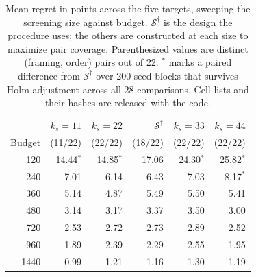 \begin{table}[!t]
\centering
\caption{Mean regret in points across the five targets, sweeping the
screening size against budget. $\mathcal{S}^{\dagger}$ is the design the
procedure uses; the others are constructed at each size to maximize pair
coverage. Parenthesized values are distinct (framing, order) pairs out of 22.
$^{*}$ marks a paired difference from $\mathcal{S}^{\dagger}$ over 200 seed
blocks that survives Holm adjustment across all 28 comparisons. Cell lists
and their hashes are released with the code.}
\label{tab:ksweep}
\footnotesize
\setlength{\tabcolsep}{5pt}
\begin{tabular}{@{}r r r r r r@{}}
\toprule
 & $k_s{=}11$ & $k_s{=}22$ & $\mathcal{S}^{\dagger}$ & $k_s{=}33$ & $k_s{=}44$ \\
Budget & (11/22) & (22/22) & (18/22) & (22/22) & (22/22) \\
\midrule
 120 & 14.44$^{*}$ & 14.85$^{*}$ & 17.06 & 24.30$^{*}$ & 25.82$^{*}$ \\
 240 &  7.01 &  6.14 &  6.43 &  7.03 &  8.17$^{*}$ \\
 360 &  5.14 &  4.87 &  5.49 &  5.50 &  5.41 \\
 480 &  3.14 &  3.17 &  3.37 &  3.50 &  3.00 \\
 720 &  2.53 &  2.72 &  2.73 &  2.89 &  2.52 \\
 960 &  1.89 &  2.39 &  2.29 &  2.55 &  1.95 \\
1440 &  0.99 &  1.21 &  1.16 &  1.30 &  1.19 \\
\bottomrule
\end{tabular}
\end{table}
